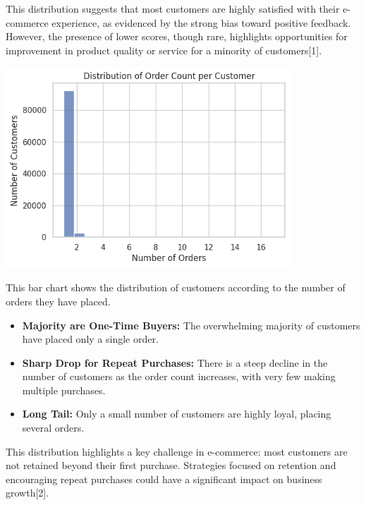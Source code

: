 \documentclass[a4paper]{article}
\begin{document}
\begin{multicols}{2}
This distribution suggests that most customers are highly satisfied with their e-commerce experience, as evidenced by the strong bias toward positive feedback. However, the presence of lower scores, though rare, highlights opportunities for improvement in product quality or service for a minority of customers[1].

\vspace{1em}

\noindent
\begin{minipage}{\columnwidth}
\centering
\includegraphics[width=0.8\textwidth]{plots/Distribution of Order Count per Customer.png}
\label{fig:order_count_per_customer}
\end{minipage}

This bar chart shows the distribution of customers according to the number of orders they have placed.

\begin{itemize}
    \item \textbf{Majority are One-Time Buyers:} The overwhelming majority of customers have placed only a single order.
    \item \textbf{Sharp Drop for Repeat Purchases:} There is a steep decline in the number of customers as the order count increases, with very few making multiple purchases.
    \item \textbf{Long Tail:} Only a small number of customers are highly loyal, placing several orders.
\end{itemize}

This distribution highlights a key challenge in e-commerce: most customers are not retained beyond their first purchase. Strategies focused on retention and encouraging repeat purchases could have a significant impact on business growth[2].


\end{multicols}
\end{document}
